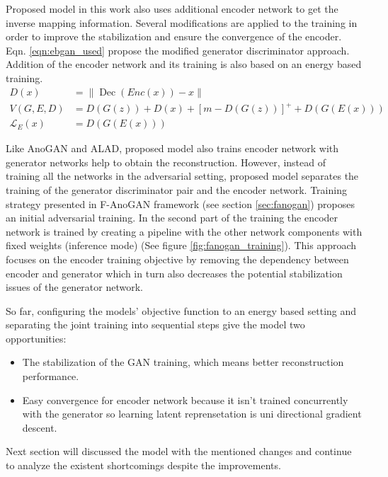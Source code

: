 Proposed model in this work also uses additional encoder network to get the inverse mapping
information. Several modifications are applied to the training in order to improve the stabilization
and ensure the convergence of the encoder. Eqn. \ref{eqn:ebgan_used} propose the modified generator
discriminator approach. Addition of the encoder network and its training is also based on an energy
based training.
\begin{equation}
\label{eqn:encebgan_used}
\begin{aligned}
D(x)&=\|\operatorname{Dec}(E n c(x))-x\|\\[5pt]
V(G,E, D) &= D(G(z)) + D(x)+[m-D(G(z))]^{+} + D(G(E(x))) \\[5pt]
\mathcal{L}_{E}(x) &= D(G(E(x)))
\end{aligned}
\end{equation}

Like AnoGAN and ALAD, proposed model also trains encoder network with generator networks help to
obtain the reconstruction. However, instead of training all the networks in the adversarial setting,
proposed model separates the training of the generator discriminator pair and the encoder network.
Training strategy presented in F-AnoGAN framework (see section \ref{sec:fanogan}) proposes an
initial adversarial training. In the second part of the training the encoder network is trained by
creating a pipeline with the other network components with fixed weights (inference mode) (See
figure \ref{fig:fanogan_training}). This approach focuses on the encoder training objective by
removing the dependency between encoder and generator which in turn also decreases the potential
stabilization issues of the generator network.

So far, configuring the models' objective function to an energy based setting and separating the
joint training into sequential steps give the model two opportunities:

\begin{itemize}
	\item The stabilization of the GAN training, which means better reconstruction performance.
	\item Easy convergence for encoder network because it isn't trained concurrently with the
	generator so learning latent reprensetation is uni directional gradient descent.
\end{itemize}

Next section will discussed the model with the mentioned changes and continue to analyze the
existent shortcomings despite the improvements.

